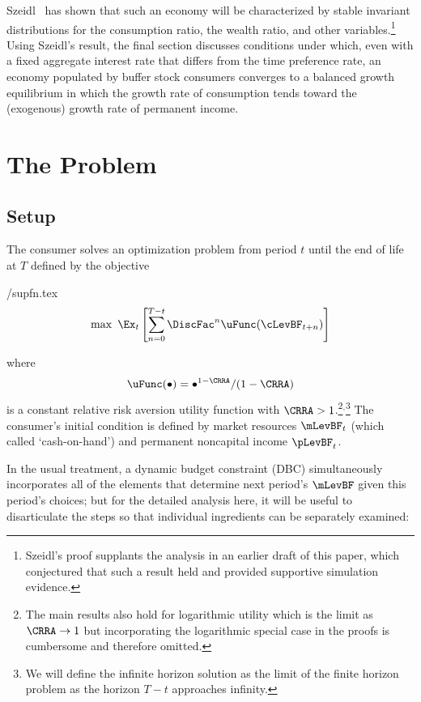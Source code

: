 \documentclass[BufferStockTheory]{subfiles}
\begin{document}
Szeidl~\citeyearpar{szeidlInvariant} has shown that such an economy will be characterized by stable invariant distributions for the consumption ratio, the wealth ratio, and other variables.\footnote{Szeidl's proof supplants the analysis in an earlier draft of this paper, which conjectured that such a result held and provided supportive simulation evidence.}  Using Szeidl's result, the final section discusses conditions under which, even with a fixed aggregate interest rate that differs from the time preference rate, an economy populated by buffer stock consumers converges to a balanced growth equilibrium in which the growth rate of consumption tends toward the (exogenous) growth rate of permanent income.

\hypertarget{The-Problem}{}
\section{The Problem}

\subsection{Setup}
\label{subsec:Setup}

The consumer solves an optimization problem from period
$t$ until the end of life at $T$ defined by the objective
\begin{verbatimwrite}{\EqDir/supfn.tex}
  \begin{align}
    \label{eq:supfn}
    \max~ \Ex_{t}\left[\sum_{n=0}^{T-t} \DiscFac^{n} \uFunc(\cLevBF_{t+n})\right]
  \end{align}
\end{verbatimwrite}

where
\begin{align}
  \uFunc(\bullet)=\bullet^{1-\CRRA}/(1-\CRRA) \label{eq:crrautil}
\end{align}
is a constant relative risk aversion utility function with $\CRRA > 1$.\footnote{The main
  results also hold for logarithmic utility which is the limit as
  $\CRRA \rightarrow 1$ but incorporating the logarithmic special case
  in the proofs is cumbersome and therefore
  omitted.}$^{,}$\footnote{We will define the infinite horizon
  solution as the limit of the finite horizon problem as the horizon
  $T-t$ approaches infinity.}  The consumer's initial condition is
defined by market resources $\mLevBF_{t}$ (which \cite{deatonLiqConstr}
called `cash-on-hand') and permanent noncapital income $\pLevBF_{t}$.

In the usual treatment, a dynamic budget constraint (DBC) simultaneously incorporates
all of the elements that determine next period's $\mLevBF$ given this
period's choices; but for the detailed analysis here, it will be useful to
disarticulate the steps so that individual ingredients can be separately examined:
\end{document}
